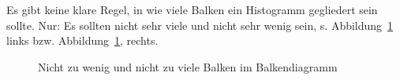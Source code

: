 \documentclass[
  letterpaper,
]{scrbook}
\theoremstyle{definition}
\theoremstyle{definition}
\theoremstyle{definition}
\theoremstyle{remark}
\begin{document}
Es gibt keine klare Regel, in wie viele Balken ein Histogramm gegliedert
sein sollte. Nur: Es sollten nicht sehr viele und nicht sehr wenig sein,
s. Abbildung~\ref{fig-zu-wenig-viele} links bzw.
Abbildung~\ref{fig-zu-wenig-viele}, rechts.

\begin{figure}

\begin{minipage}{0.50\linewidth}



\end{minipage}%
%
\begin{minipage}{0.50\linewidth}



\end{minipage}%

\caption{\label{fig-zu-wenig-viele}Nicht zu wenig und nicht zu viele
Balken im Balkendiagramm}

\end{figure}%
\end{document}
